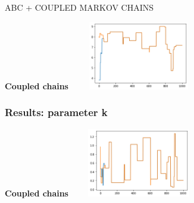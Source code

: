 \documentclass{beamer}
\begin{document}
\begin{section}{ABC + COUPLED MARKOV CHAINS}
\begin{frame}
\begin{center}
				{\scriptsize \textbf{Coupled chains}}
				\includegraphics[width=6cm,height=3cm]{immagini_mario/g_all_chains}
		
		
	\end{center}
\end{frame}
\begin{frame}
	\frametitle{Results: parameter k}
	\begin{center}
	
				{\scriptsize \textbf{Coupled chains}}
				\includegraphics[width=6cm,height=3cm]{immagini_mario/k_all_chains}
		
	

	\end{center}
\end{frame}
\end{section}
	
	
\end{document}
